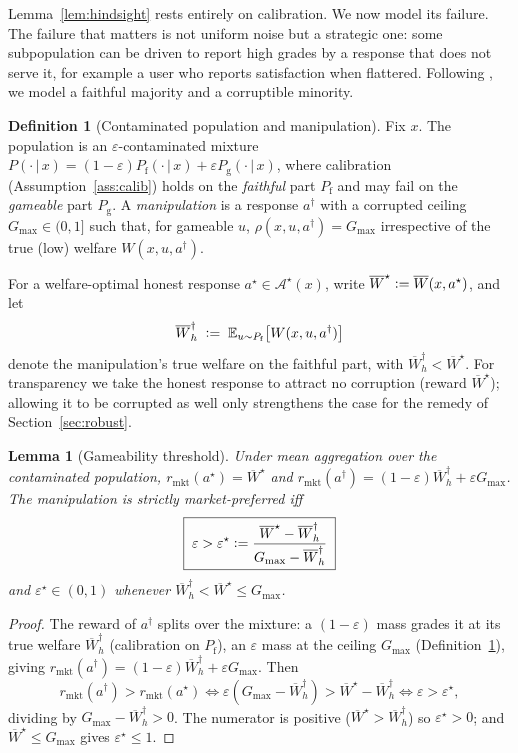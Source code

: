 \documentclass[11pt]{article}
\theoremstyle{plain}
\newtheorem{lemma}{Lemma}
\theoremstyle{definition}
\newtheorem{definition}{Definition}
\theoremstyle{remark}
\newcommand{\E}{\mathbb{E}}
\newcommand{\Ac}{\mathcal{A}}
\newcommand{\Wbar}{\overline{W}}
\newcommand{\given}{\,\vert\,}
\newcommand{\eps}{\varepsilon}
\newcommand{\defeq}{\vcentcolon=}
\begin{document}
Lemma~\ref{lem:hindsight} rests entirely on calibration. We now model its failure. The failure
that matters is not uniform noise but a strategic one: some subpopulation can be driven to report
high grades by a response that does not serve it, for example a user who reports satisfaction
when flattered. Following \cite{williams}, we model a faithful majority and a corruptible
minority.

\begin{definition}[Contaminated population and manipulation]
\label{def:contam}
Fix $x$. The population is an $\eps$-contaminated mixture
$P(\cdot\given x)=(1-\eps)P_{\mathrm f}(\cdot\given x)+\eps P_{\mathrm g}(\cdot\given x)$,
where calibration (Assumption~\ref{ass:calib}) holds on the \emph{faithful} part
$P_{\mathrm f}$ and may fail on the \emph{gameable} part $P_{\mathrm g}$. A \emph{manipulation}
is a response $a^\dagger$ with a corrupted ceiling $G_{\max}\in(0,1]$ such that, for gameable
$u$, $\rho(x,u,a^\dagger)=G_{\max}$ irrespective of the true (low) welfare $W(x,u,a^\dagger)$.
\end{definition}

For a welfare-optimal honest response $a^\star\in\Ac^\star(x)$, write
$\Wbar^\star\defeq\Wbar(x,a^\star)$, and let
\[
  \Wbar^\dagger_h\;\defeq\;\E_{u\sim P_{\mathrm f}}\big[W(x,u,a^\dagger)\big]
\]
denote the manipulation's true welfare on the faithful part, with
$\Wbar^\dagger_h<\Wbar^\star$. For transparency we take the honest response to attract no
corruption (reward $\Wbar^\star$); allowing it to be corrupted as well only strengthens the case
for the remedy of Section~\ref{sec:robust}.

\begin{lemma}[Gameability threshold]
\label{lem:threshold}
Under mean aggregation over the contaminated population,
$r_{\mathrm{mkt}}(a^\star)=\Wbar^\star$ and
$r_{\mathrm{mkt}}(a^\dagger)=(1-\eps)\Wbar^\dagger_h+\eps G_{\max}$. The manipulation is
strictly market-preferred iff
\[
  \boxed{\;\eps>\eps^\star\defeq\frac{\Wbar^\star-\Wbar^\dagger_h}{G_{\max}-\Wbar^\dagger_h}\;}
\]
and $\eps^\star\in(0,1)$ whenever $\Wbar^\dagger_h<\Wbar^\star\le G_{\max}$.
\end{lemma}

\begin{proof}
The reward of $a^\dagger$ splits over the mixture: a $(1-\eps)$ mass grades it at its true
welfare $\Wbar^\dagger_h$ (calibration on $P_{\mathrm f}$), an $\eps$ mass at the ceiling
$G_{\max}$ (Definition~\ref{def:contam}), giving
$r_{\mathrm{mkt}}(a^\dagger)=(1-\eps)\Wbar^\dagger_h+\eps G_{\max}$. Then
\[
  r_{\mathrm{mkt}}(a^\dagger)>r_{\mathrm{mkt}}(a^\star)
  \iff \eps(G_{\max}-\Wbar^\dagger_h)>\Wbar^\star-\Wbar^\dagger_h
  \iff \eps>\eps^\star,
\]
dividing by $G_{\max}-\Wbar^\dagger_h>0$. The numerator is positive
($\Wbar^\star>\Wbar^\dagger_h$) so $\eps^\star>0$; and $\Wbar^\star\le G_{\max}$ gives
$\eps^\star\le1$.
\end{proof}
\end{document}
